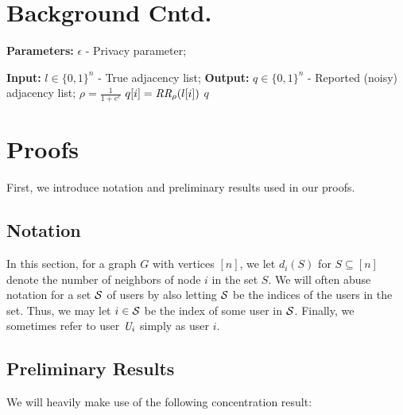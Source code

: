 
\section{Background Cntd.}\label{app:background}


\setlength{\textfloatsep}{2pt}
\begin{algorithm}
  \caption{$\rr_\rho: \{0,1\}^n\mapsto\{0,1\}^n$ }\label{alg:rr}
  \begin{algorithmic}[1]
  \Statex \textbf{Parameters:} $\epsilon$ - Privacy parameter;
  
  \Statex\textbf{Input:} $l \in \{0,1\}^n$ - True adjacency list;
  \Statex \textbf{Output:} $q \in \{0,1\}^n$ - Reported (noisy) adjacency list;
  \vspace{0.2cm}
  \State $\rho=\frac{1}{1+e^{\epsilon}}$
  \State $q[i]=\textit{RR}_\rho(l[i])$
  \EndFor
  \Return $q$
  \end{algorithmic}
\end{algorithm}

\section{Proofs}\label{app:proofs}
First, we introduce notation and preliminary results used in our proofs.
\subsection{Notation} In this section, for a graph $G$ with vertices $[n]$, we let $d_i(S)$ for $S \subseteq [n]$ denote the number of neighbors of node $i$ in the set $S$.
We will often abuse notation for a set $\mathcal{S}$ of users by also letting $\mathcal{S}$ be the indices of the users in the set. Thus, we may let $i \in \mathcal{S}$ be the index of some user in $\mathcal{S}$.
Finally, we sometimes refer to user $\textit{U}_i$ simply as user $i$.

\subsection{Preliminary Results}
We will heavily make use of the following concentration result:

